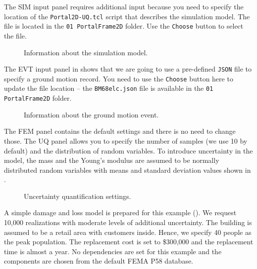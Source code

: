 The SIM input panel requires additional input because you need to specify the location of the \texttt{Portal2D-UQ.tcl} script that describes the simulation model. The file is located in the \texttt{01 PortalFrame2D} folder. Use the \texttt{Choose} button to select the file.\\

\begin{figure}[!htbp]
  \caption{Information about the simulation model.}
  \label{fig:ex_1_SIM}
\end{figure}

The EVT input panel in  shows that we are going to use a pre-defined \texttt{JSON} file to specify a ground motion record. You need to use the \texttt{Choose} button here to update the file location – the \texttt{BM68elc.json} file is available in the \texttt{01 PortalFrame2D} folder.\\

\begin{figure}[!htbp]
  \caption{Information about the ground motion event.}
  \label{fig:ex_1_EVT}
\end{figure}

The FEM panel contains the default settings and there is no need to change those. The UQ panel allows you to specify the number of samples (we use 10 by default) and the distribution of random variables. To introduce uncertainty in the model, the mass and the Young’s modulus are assumed to be normally distributed random variables with means and standard deviation values shown in .\\

\begin{figure}[!htbp]
  \caption{Uncertainty quantification settings.}
  \label{fig:ex_1_UQ}
\end{figure}

A simple damage and loss model is prepared for this example (). We request 10,000 realizations with moderate levels of additional uncertainty. The building is assumed to be a retail area with customers inside. Hence, we specify 40 people as the peak population. The replacement cost is set to \$300,000 and the replacement time is almost a year. No dependencies are set for this example and the components are chosen from the default FEMA P58 database.\\

